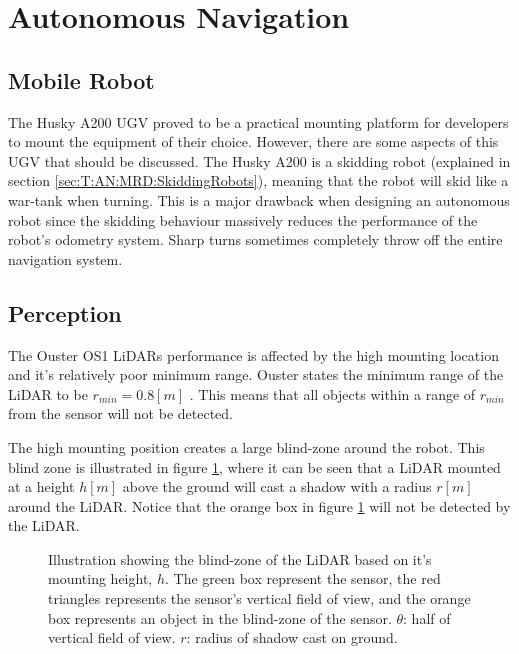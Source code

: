\section{Autonomous Navigation} \label{sec:D:AutonomousNavigaion}

\subsection{Mobile Robot} \label{sec:D:AN:MobileRobot}
The Husky A200 UGV proved to be a practical mounting platform for developers to mount the equipment of their choice. However, there are some aspects of this UGV that should be discussed. The Husky A200 is a skidding robot (explained in section \ref{sec:T:AN:MRD:SkiddingRobots}), meaning that the robot will skid like a war-tank when turning. This is a major drawback when designing an autonomous robot since the skidding behaviour massively reduces the performance of the robot's odometry system. Sharp turns sometimes completely throw off the entire navigation system. 

\subsection{Perception} \label{sec:D:AN:Perception}
The Ouster OS1 LiDARs performance is affected by the high mounting location and it's relatively poor minimum range. Ouster states the minimum range of the LiDAR to be $r_{min}=0.8[m]$ \cite{OS1_datasheet}. This means that all objects within a range of $r_{min}$ from the sensor will not be detected.

The high mounting position creates a large blind-zone around the robot. This blind zone is illustrated in figure \ref{fig:D:AN:P:LidarShadow}, where it can be seen that a LiDAR mounted at a height $h[m]$ above the ground will cast a shadow with a radius $r[m]$ around the LiDAR. Notice that the orange box in figure \ref{fig:D:AN:P:LidarShadow} will not be detected by the LiDAR.

\begin{figure}[ht]
  \centering
  
  \caption{Illustration showing the blind-zone of the LiDAR based on it's mounting height, $h$. The green box represent the sensor, the red triangles represents the sensor's vertical field of view, and the orange box represents an object in the blind-zone of the sensor. $\theta$: half of vertical field of view. $r$: radius of shadow cast on ground.}
  \label{fig:D:AN:P:LidarShadow}
\end{figure}

